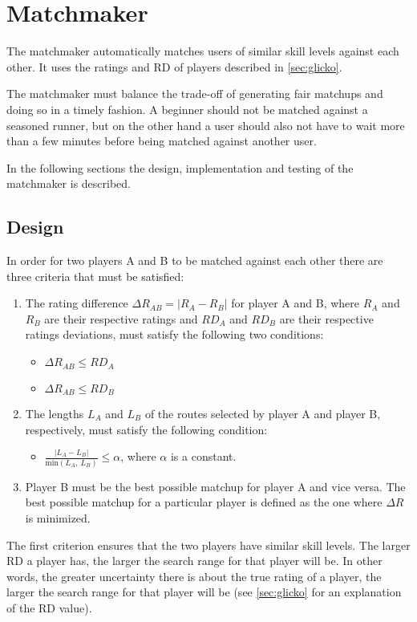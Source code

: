 \section{Matchmaker}
The matchmaker automatically matches users of similar skill levels against each other.
It uses the ratings and RD of players described in \autoref{sec:glicko}.

The matchmaker must balance the trade-off of generating fair matchups and doing so in a timely fashion.
A beginner should not be matched against a seasoned runner, but on the other hand a user should also not have to wait more than a few minutes before being matched against another user.

In the following sections the design, implementation and testing of the matchmaker is described.

\subsection{Design}
In order for two players A and B to be matched against each other there are three criteria that must be satisfied:

\begin{enumerate}
	\item{The rating difference $\Delta R_{AB} = \left|R_A-R_B\right|$ for player A and B, where $R_A$ and $R_B$ are their respective ratings and $RD_A$ and $RD_B$ are their respective ratings deviations, must satisfy the following two conditions:}
		\begin{itemize}
			\item{$\Delta R_{AB} \leq RD_A$}
			\item{$\Delta R_{AB} \leq RD_B$}
		\end{itemize}
	\item{The lengths $L_A$ and $L_B$ of the routes selected by player A and player B, respectively, must satisfy the following condition:}
		\begin{itemize}
			\item{$\frac{\left|L_A-L_B\right|}{\mathrm{min}\left(L_A,\:	L_B\right)} \leq \alpha$, where $\alpha$ is a constant.	}
		\end{itemize}
	\item{Player B must be the best possible matchup for player A and vice versa. The best possible matchup for a particular player is defined as the one where $\Delta R$ is minimized.}
\end{enumerate}

The first criterion ensures that the two players have similar skill levels.
The larger RD a player has, the larger the search range for that player will be.
In other words, the greater uncertainty there is about the true rating of a player, the larger the search range for that player will be (see \autoref{sec:glicko} for an explanation of the RD value).

